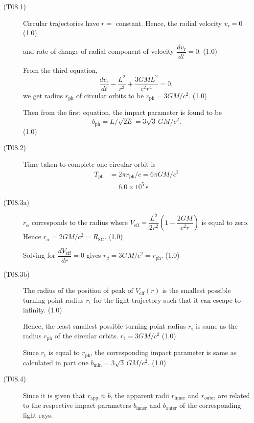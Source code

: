 \begin{description}
\item[(T08.1)] Circular trajectories have $r = $ constant. Hence, the radial
  velocity $v_{\mathrm{r}} = 0$ \hfill(1.0)

  and rate of change of radial component of velocity
  $\dfrac{dv_{\mathrm{r}}}{dt} = 0$. \hfill(1.0)

  From the third equation,
  \[
    \frac{dv_{\mathrm{r}}}{dt} - \frac{L^2}{r^3} + \frac{3 G M L^2}{c^2 r^4}
    = 0,
  \]
  we get radius $r_{\mathrm{ph}}$ of circular orbits to be
  $r_{\mathrm{ph}} = 3GM/c^2$. \hfill(1.0)

  Then from the first equation, the impact parameter is found to be
  \[
    b_{\mathrm{ph}} = L/\sqrt{2E} = 3\sqrt{3}\,GM/c^2.
  \]
  \hfill(1.0)

\item[(T08.2)] Time taken to complete one circular orbit is
  \begin{align*}
    T_{\mathrm{ph}} &= 2\pi r_{\mathrm{ph}}/c = 6\pi G M/c^3
      \tag*{(1.0)}\\
      &= 6.0 \times 10^{5}\,\mathrm{s}
      \tag*{(1.0)}
  \end{align*}

\item[(T08.3a)] $r_\alpha$ corresponds to the radius where
  $V_{\mathrm{eff}} = \dfrac{L^2}{2r^2}\left(1 - \dfrac{2GM}{c^2 r}\right)$ is
  equal to zero. Hence $r_\alpha = 2GM/c^2 = R_{\mathrm{SC}}$. \hfill(1.0)

  Solving for $\dfrac{dV_{\mathrm{eff}}}{dr} = 0$ gives
  $r_\beta = 3GM/c^2 = r_{\mathrm{ph}}$. \hfill(1.0)

\item[(T08.3b)] The radius of the position of peak of $V_{\mathrm{eff}}(r)$ is
  the smallest possible turning point radius $r_{\mathrm{t}}$ for the light
  trajectory such that it can escape to infinity. \hfill(1.0)

  Hence, the least smallest possible turning point radius $r_{\mathrm{t}}$ is
  same as the radius $r_{\mathrm{ph}}$ of the circular orbits.
  $r_{\mathrm{t}} = 3GM/c^2$ \hfill(1.0)

  Since $r_{\mathrm{t}}$ is equal to $r_{\mathrm{ph}}$, the corresponding
  impact parameter is same as calculated in part one
  $b_{\mathrm{min}} = 3\sqrt{3}\,GM/c^2$. \hfill(1.0)

\item[(T08.4)] Since it is given that $r_{\mathrm{app}} \approx b$, the
  apparent radii $r_{\mathrm{inner}}$ and $r_{\mathrm{outer}}$ are related to
  the respective impact parameters $b_{\mathrm{inner}}$ and
  $b_{\mathrm{outer}}$ of the corresponding light rays.


\end{description}
